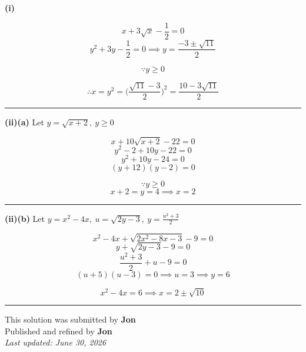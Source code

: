 \documentclass[12pt]{article}
\begin{document}
\newcommand{\ds}{\displaystyle}

\textbf{(i) }

$$x+3\sqrt{x}-\frac12=0$$
$$y^2+3y-\frac12=0\implies y=\frac{-3\pm\sqrt{11}}2$$

$$\because y\geq 0$$

$$\therefore x=y^2=\biggl(\frac{\sqrt{11}-3}{2}\biggr)^2=\frac{10-3\sqrt{11}}2$$

\bigskip\hrule\bigskip

\textbf{(ii)(a)} Let $\ds y=\sqrt{x+2},\ y\geq 0$

$$x+10\sqrt{x+2}-22=0$$
$$ y^2-2+10y-22=0$$
$$y^2+10y-24=0$$
$$(y+12)(y-2)=0$$


$$\because y\geq 0$$
$$x+2=y=4\implies x=2$$

\bigskip\hrule\bigskip

\textbf{(ii)(b)} Let $\ds y=x^2-4x,\ u=\sqrt{2y-3},\  y=\frac{u^2+3}{2}$

$$x^2-4x+\sqrt{2x^2-8x-3}-9=0$$
$$y+\sqrt{2y-3}-9=0$$
$$\frac{u^2+3}{2}+u-9=0$$
$$(u+5)(u-3)=0\implies u=3\implies y=6$$

$$x^2-4x=6\implies x=2\pm\sqrt{10}$$

\bigskip
\hrule
\begin{center}
    This solution was submitted by \textbf{Jon}\\[4pt]
    Published and refined by \textbf{Jon}\\[8pt]
    \textit{Last updated: June 30, 2026}
\end{center}
\end{document}
